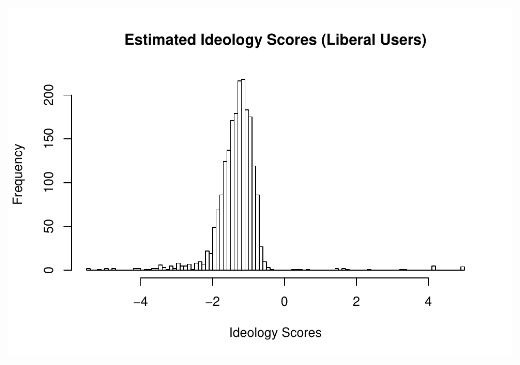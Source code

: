 \documentclass[]{book}
\begin{document}
\includegraphics{bookdown-demo_files/figure-latex/unnamed-chunk-30-3.pdf}


\end{document}
